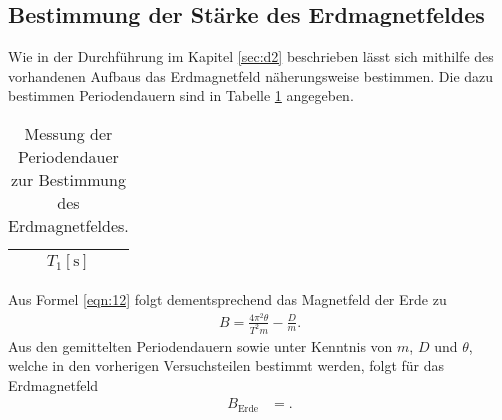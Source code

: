 \subsection{Bestimmung der Stärke des Erdmagnetfeldes}
Wie in der Durchführung im Kapitel \ref{sec:d2} beschrieben lässt sich mithilfe des vorhandenen Aufbaus das Erdmagnetfeld näherungsweise bestimmen.
Die dazu bestimmen Periodendauern sind in Tabelle \ref{tab:5} angegeben.
\begin{table}[H]
  \centering
  \caption{Messung der Periodendauer zur Bestimmung des Erdmagnetfeldes.}
  \label{tab:5}
  \begin{tabular}{c}
    \toprule
    {$T_1 [\si{\second}]$}\\
    \midrule
    
    \bottomrule
  \end{tabular}
\end{table}
Aus Formel \eqref{eqn:12} folgt dementsprechend das Magnetfeld der Erde zu
\begin{align}
  B = \frac{4 \pi^2 \theta}{T^2 m} - \frac{D}{m}.
\end{align}
Aus den gemittelten Periodendauern sowie unter Kenntnis von $m$, $D$ und $\theta$, welche in den vorherigen Versuchsteilen bestimmt werden, folgt für das Erdmagnetfeld
\begin{align*}
  B_{\text{Erde}} &= .
\end{align*}
%
%    
%
